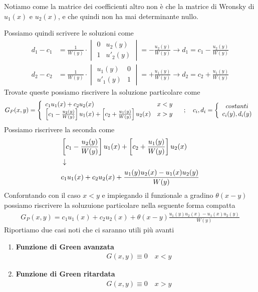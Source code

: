 Notiamo come la matrice dei coefficienti altro non è che la matrice di Wronsky di $u_1(x)$ e $u_2(x)$, e che quindi non ha mai determinante nullo. 

Possiamo quindi scrivere le soluzioni come
\begin{align}
d_1 - c_1 &= \frac{1}{W(y)} \cdot \begin{vmatrix}
			0 & u_2(y) \\
			1 & u'_2(y)
	\end{vmatrix} = -\frac{u_2(y)}{W(y)} \to d_1 = c_1  -\frac{u_2(y)}{W(y)}\\
d_2 - c_2 &= \frac{1}{W(y)} \cdot \begin{vmatrix}
	u_1(y) & 0\\
	u'_1(y) & 1
\end{vmatrix} = +\frac{u_1(y)}{W(y)} \to d_2 = c_2 +\frac{u_1(y)}{W(y)}
\end{align}
Trovate queste possiamo riscrivere la soluzione particolare come
\begin{align}
	G_P(x,y) = \double{c_1 u_1 (x) + c_2 u_2 (x) \hfill x<y}{\left[  c_1  -\frac{u_2(y)}{W(y)} \right] u_1 (x) + \left[ c_2 +\frac{u_1(y)}{W(y)} \right] u_2 (x) \quad x>y} \spacer c_i,d_i = \double{costanti}{c_i(y), d_i(y)}
\end{align}
Possiamo riscrivere la seconda come
\begin{align}
&\left[  c_1  -\frac{u_2(y)}{W(y)} \right] u_1 (x) + \left[ c_2 +\frac{u_1(y)}{W(y)} \right] u_2 (x)\\ &\downarrow \nonumber \\
&c_1 u_1 (x) + c_2 u_2 (x) + \frac{u_1(y)u_2(x) - u_1(x)u_2(y)}{W(y)}
\end{align}
Conforntando con il caso $x<y$ e impiegando il funzionale a gradino $\theta(x-y)$ possiamo riscrivere la soluzuione particolare nella seguente forma compatta
\begin{align}
	G_P(x,y)= c_1 u_1 (x) + c_2 u_2 (x) + \theta(x-y) \frac{u_1(y)u_2(x) - u_1(x)u_2(y)}{W(y)}
\end{align}
Riportiamo due casi noti che ci saranno utili più avanti
\begin{enumerate}
	\item \textbf{Funzione di Green avanzata}
		\begin{align}
			&G(x,y) \equiv 0 \quad x<y 
		\end{align}
	\item \textbf{Funzione di Green ritardata}
		\begin{align}
			&G(x,y) \equiv 0 \quad x>y 
		\end{align}
\end{enumerate}
\newpage

